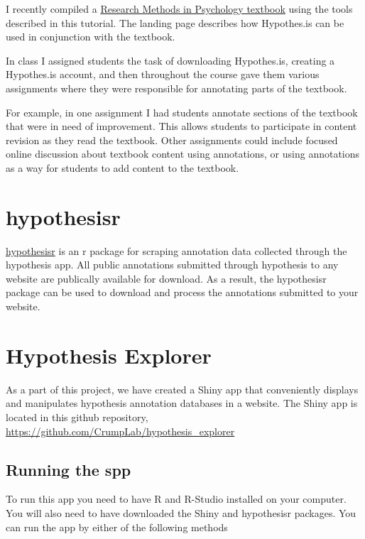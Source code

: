 \documentclass[]{book}
\theoremstyle{definition}
\theoremstyle{definition}
\theoremstyle{definition}
\theoremstyle{remark}
\begin{document}
I recently compiled a
\href{http://crumplab.github.io/ResearchMethods/}{Research Methods in
Psychology textbook} using the tools described in this tutorial. The
landing page describes how Hypothes.is can be used in conjunction with
the textbook.

In class I assigned students the task of downloading Hypothes.is,
creating a Hypothes.is account, and then throughout the course gave them
various assignments where they were responsible for annotating parts of
the textbook.

For example, in one assignment I had students annotate sections of the
textbook that were in need of improvement. This allows students to
participate in content revision as they read the textbook. Other
assignments could include focused online discussion about textbook
content using annotations, or using annotations as a way for students to
add content to the textbook.

\section{hypothesisr}\label{hypothesisr-1}

\href{https://github.com/mdlincoln/hypothesisr}{hypothesisr} is an r
package for scraping annotation data collected through the hypothesis
app. All public annotations submitted through hypothesis to any website
are publically available for download. As a result, the hypothesisr
package can be used to download and process the annotations submitted to
your website.

\section{Hypothesis Explorer}\label{hypothesis-explorer}

As a part of this project, we have created a Shiny app that conveniently
displays and manipulates hypothesis annotation databases in a website.
The Shiny app is located in this github repository,
\url{https://github.com/CrumpLab/hypothesis_explorer}

\subsection{Running the spp}\label{running-the-spp}

To run this app you need to have R and R-Studio installed on your
computer. You will also need to have downloaded the Shiny and
hypothesisr packages. You can run the app by either of the following
methods
\end{document}
